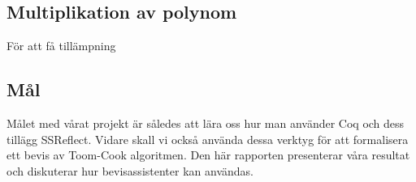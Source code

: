 \subsection{Multiplikation av polynom}
För att få tillämpning

\subsection{Mål}
Målet med vårat projekt är således att lära oss hur man använder Coq och dess
tillägg SSReflect. Vidare skall vi också använda dessa verktyg för att
formalisera ett bevis av Toom-Cook algoritmen. Den här rapporten presenterar
våra resultat och diskuterar hur bevisassistenter kan användas.

